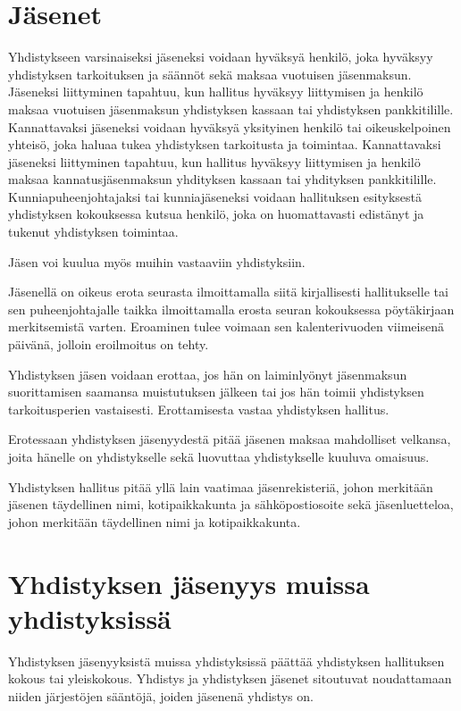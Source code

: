 \documentclass[a4paper, 12pt, finnish]{scrartcl}
\begin{document}
\section{Jäsenet}
Yhdistykseen varsinaiseksi jäseneksi voidaan hyväksyä henkilö, joka hyväksyy yhdistyksen tarkoituksen ja säännöt sekä maksaa vuotuisen jäsenmaksun.
Jäseneksi liittyminen tapahtuu, kun hallitus hyväksyy liittymisen ja henkilö maksaa vuotuisen jäsenmaksun yhdistyksen kassaan tai yhdistyksen pankkitilille.
Kannattavaksi jäseneksi voidaan hyväksyä yksityinen henkilö tai oikeuskelpoinen yhteisö, joka haluaa tukea yhdistyksen tarkoitusta ja toimintaa.
Kannattavaksi jäseneksi liittyminen tapahtuu, kun hallitus hyväksyy liittymisen ja henkilö maksaa kannatusjäsenmaksun yhdityksen kassaan tai yhdityksen pankkitilille.
Kunniapuheenjohtajaksi tai kunniajäseneksi voidaan hallituksen esityksestä yhdistyksen kokouksessa kutsua henkilö, joka on huomattavasti edistänyt ja tukenut yhdistyksen toimintaa.

Jäsen voi kuulua myös muihin vastaaviin yhdistyksiin.

Jäsenellä on oikeus erota seurasta ilmoittamalla siitä kirjallisesti hallitukselle tai sen puheenjohtajalle taikka ilmoittamalla erosta seuran kokouksessa pöytäkirjaan merkitsemistä varten. Eroaminen tulee voimaan sen kalenterivuoden viimeisenä päivänä, jolloin eroilmoitus on tehty.

Yhdistyksen jäsen voidaan erottaa, jos hän on laiminlyönyt jäsenmaksun suorittamisen saamansa muistutuksen jälkeen tai jos hän toimii yhdistyksen tarkoitusperien vastaisesti.
Erottamisesta vastaa yhdistyksen hallitus.

Erotessaan yhdistyksen jäsenyydestä pitää jäsenen maksaa mahdolliset velkansa, joita hänelle on yhdistykselle sekä luovuttaa yhdistykselle kuuluva omaisuus.

Yhdistyksen hallitus pitää yllä lain vaatimaa jäsenrekisteriä, johon merkitään jäsenen täydellinen nimi, kotipaikkakunta ja sähköpostiosoite sekä jäsenluetteloa, johon merkitään täydellinen nimi ja kotipaikkakunta.


\section{Yhdistyksen jäsenyys muissa yhdistyksissä}
Yhdistyksen jäsenyyksistä muissa yhdistyksissä päättää yhdistyksen hallituksen kokous tai yleiskokous.
Yhdistys ja yhdistyksen jäsenet sitoutuvat noudattamaan niiden järjestöjen sääntöjä, joiden jäsenenä yhdistys on.
\end{document}
